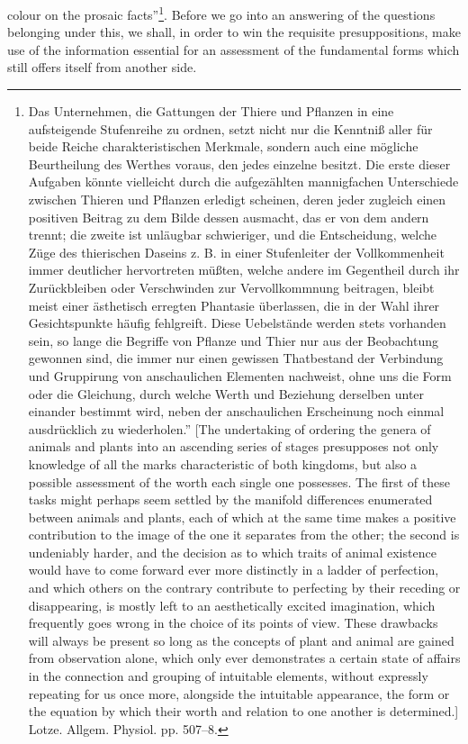 \documentclass[12pt,a4paper]{book}
\begin{document}
colour on the prosaic facts''\footnote{Das Unternehmen, die Gattungen der Thiere
und Pflanzen in eine aufsteigende Stufenreihe zu ordnen, setzt nicht nur die
Kenntniß aller für beide Reiche charakteristischen Merkmale, sondern auch eine
mögliche Beurtheilung des Werthes voraus, den jedes einzelne besitzt. Die erste
dieser Aufgaben könnte vielleicht durch die aufgezählten mannigfachen Unterschiede
zwischen Thieren und Pflanzen erledigt scheinen, deren jeder zugleich einen
positiven Beitrag zu dem Bilde dessen ausmacht, das er von dem andern trennt; die
zweite ist unläugbar schwieriger, und die Entscheidung, welche Züge des thierischen
Daseins z. B. in einer Stufenleiter der Vollkommenheit immer deutlicher hervortreten
müßten, welche andere im Gegentheil durch ihr Zurückbleiben oder Verschwinden zur
Vervollkommnung beitragen, bleibt meist einer ästhetisch erregten Phantasie
überlassen, die in der Wahl ihrer Gesichtspunkte häufig fehlgreift. Diese
Uebelstände werden stets vorhanden sein, so lange die Begriffe von Pflanze und
Thier nur aus der Beobachtung gewonnen sind, die immer nur einen gewissen
Thatbestand der Verbindung und Gruppirung von anschaulichen Elementen nachweist,
ohne uns die Form oder die Gleichung, durch welche Werth und Beziehung derselben
unter einander bestimmt wird, neben der anschaulichen Erscheinung noch einmal
ausdrücklich zu wiederholen.'' [The undertaking of ordering the genera of animals
and plants into an ascending series of stages presupposes not only knowledge of all
the marks characteristic of both kingdoms, but also a possible assessment of the
worth each single one possesses. The first of these tasks might perhaps seem
settled by the manifold differences enumerated between animals and plants, each of
which at the same time makes a positive contribution to the image of the one it
separates from the other; the second is undeniably harder, and the decision as to
which traits of animal existence would have to come forward ever more distinctly in
a ladder of perfection, and which others on the contrary contribute to perfecting
by their receding or disappearing, is mostly left to an aesthetically excited
imagination, which frequently goes wrong in the choice of its points of view. These
drawbacks will always be present so long as the concepts of plant and animal are
gained from observation alone, which only ever demonstrates a certain state of
affairs in the connection and grouping of intuitable elements, without expressly
repeating for us once more, alongside the intuitable appearance, the form or the
equation by which their worth and relation to one another is determined.] Lotze.
Allgem. Physiol. pp. 507--8.}. Before we go into
an answering of the questions belonging under this, we shall, in order to win the
requisite presuppositions, make use of the information essential for an assessment
of the fundamental forms which still offers itself from another side.
\end{document}
